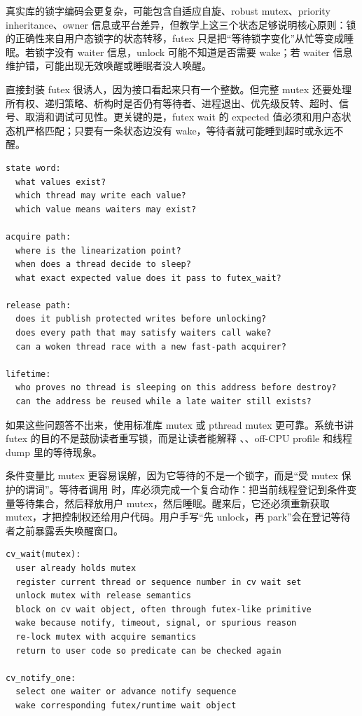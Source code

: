 真实库的锁字编码会更复杂，可能包含自适应自旋、robust mutex、priority inheritance、owner 信息或平台差异，但教学上这三个状态足够说明核心原则：锁的正确性来自用户态锁字的状态转移，futex 只是把“等待锁字变化”从忙等变成睡眠。若锁字没有 waiter 信息，unlock 可能不知道是否需要 wake；若 waiter 信息维护错，可能出现无效唤醒或睡眠者没人唤醒。

直接封装 futex 很诱人，因为接口看起来只有一个整数。但完整 mutex 还要处理所有权、递归策略、析构时是否仍有等待者、进程退出、优先级反转、超时、信号、取消和调试可见性。更关键的是，futex wait 的 expected 值必须和用户态状态机严格匹配；只要有一条状态边没有 wake，等待者就可能睡到超时或永远不醒。

\begin{lstlisting}[numbers=none,caption={简化 futex mutex 的审查清单}]
state word:
  what values exist?
  which thread may write each value?
  which value means waiters may exist?

acquire path:
  where is the linearization point?
  when does a thread decide to sleep?
  what exact expected value does it pass to futex_wait?

release path:
  does it publish protected writes before unlocking?
  does every path that may satisfy waiters call wake?
  can a woken thread race with a new fast-path acquirer?

lifetime:
  who proves no thread is sleeping on this address before destroy?
  can the address be reused while a late waiter still exists?
\end{lstlisting}

如果这些问题答不出来，使用标准库 mutex 或 pthread mutex 更可靠。系统书讲 futex 的目的不是鼓励读者重写锁，而是让读者能解释 、、off-CPU profile 和线程 dump 里的等待现象。

条件变量比 mutex 更容易误解，因为它等待的不是一个锁字，而是“受 mutex 保护的谓词”。等待者调用  时，库必须完成一个复合动作：把当前线程登记到条件变量等待集合，然后释放用户 mutex，然后睡眠。醒来后，它还必须重新获取 mutex，才把控制权还给用户代码。用户手写“先 unlock，再 park”会在登记等待者之前暴露丢失唤醒窗口。

\begin{lstlisting}[numbers=none,caption={condition variable wait 的库协议}]
cv_wait(mutex):
  user already holds mutex
  register current thread or sequence number in cv wait set
  unlock mutex with release semantics
  block on cv wait object, often through futex-like primitive
  wake because notify, timeout, signal, or spurious reason
  re-lock mutex with acquire semantics
  return to user code so predicate can be checked again

cv_notify_one:
  select one waiter or advance notify sequence
  wake corresponding futex/runtime wait object
\end{lstlisting}

